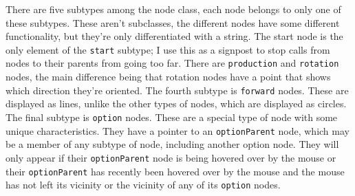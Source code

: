 \documentclass[12pt,twoside]{reedthesis}
\newcommand{\code}[1]{\texttt{#1}}
\begin{document}
	There are five subtypes among the node class, each node belongs to only one of these subtypes. These aren't subclasses, the different nodes have some different functionality, but they're only differentiated with a string. The start node is the only element of the \code{start} subtype; I use this as a signpost to stop calls from nodes to their parents from going too far. There are \code{production} and \code{rotation} nodes, the main difference being that rotation nodes have a point that shows which direction they're oriented. The fourth subtype is \code{forward} nodes. These are displayed as lines, unlike the other types of nodes, which are displayed as circles. The final subtype is \code{option} nodes. These are a special type of node with some unique characteristics. They have a pointer to an \code{optionParent} node, which may be a member of any subtype of node, including another option node. They will only appear if their \code{optionParent} node is being hovered over by the mouse or their \code{optionParent} has recently been hovered over by the mouse and the mouse has not left its vicinity or the vicinity of any of its \code{option} nodes.
	
\end{document}
